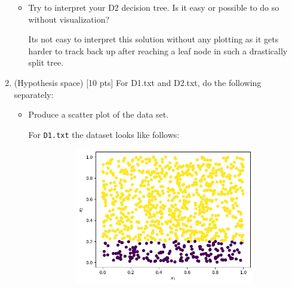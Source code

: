 \documentclass[a4paper]{article}
\theoremstyle{definition}
\newenvironment{soln}{
    \leavevmode\color{blue}\ignorespaces
}{}
\begin{document}
\begin{enumerate}
\begin{itemize}
  \item Try to interpret your D2 decision tree. Is it easy or possible to do so without visualization? \\
  \begin{soln}
      Its not easy to interpret this solution without any plotting as it gets harder to track back up after reaching a leaf node in such a drastically split tree.
  \end{soln}
  
  \end{itemize}

\item (Hypothesis space)  [10 pts] For D1.txt and D2.txt, do the following separately:
  \begin{itemize}
  
  \item Produce a scatter plot of the data set.\\
    \begin{soln}
        For \texttt{D1.txt} the dataset looks like follows:
        \begin{figure}[H]
            \begin{subfigure}{0.5\textwidth}
                \centering
                \includegraphics[scale=0.3]{Images/Q6/DTq6d1.png}
            \end{subfigure}%
            \begin{subfigure}{0.5\textwidth}
                \centering

\end{subfigure}
\end{figure}
\end{soln}
\end{itemize}
\end{enumerate}
\end{document}
